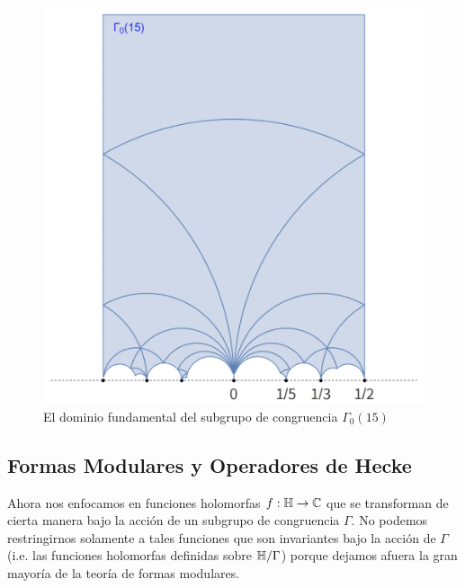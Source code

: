 \documentclass[../../tesis_maestria]{subfiles}
\begin{document}
\begin{figure}[!h]%
  \centering
  \includegraphics[scale=0.25]{figuras/domfundgamma015}
  \caption{El dominio fundamental del subgrupo de congruencia $\Gamma_0(15)$}
  \label{fig:domfunGamma15}
\end{figure}%













\subsection{Formas Modulares y Operadores de Hecke}%

Ahora nos enfocamos en funciones holomorfas $f:\mathbb{H}\rightarrow\mathbb{C}$ que se transforman de cierta manera bajo
la acci\'on de un subgrupo de congruencia $\Gamma$. No podemos restringirnos solamente a tales
funciones que son invariantes bajo la acci\'on de $\Gamma$ (i.e. las funciones holomorfas definidas
sobre $\mathbb{H}/\Gamma$) porque dejamos afuera la gran mayor\'ia de la teor\'ia de formas modulares.
\end{document}
